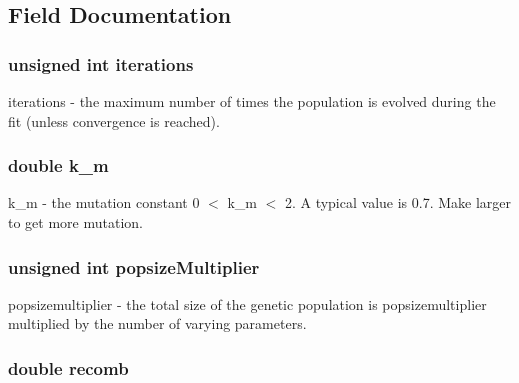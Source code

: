 \subsection{Field Documentation}
\hypertarget{structgencurvefit_options_a49884a390fe5592f17ab6795b728d63c}{
\subsubsection[{iterations}]{\setlength{\rightskip}{0pt plus 5cm}unsigned int {\bf iterations}}}
\label{structgencurvefit_options_a49884a390fe5592f17ab6795b728d63c}
iterations -\/ the maximum number of times the population is evolved during the fit (unless convergence is reached). \hypertarget{structgencurvefit_options_a59bef0ce7a5cd9e1caa5cfa556bde37f}{
\subsubsection[{k\_\-m}]{\setlength{\rightskip}{0pt plus 5cm}double {\bf k\_\-m}}}
\label{structgencurvefit_options_a59bef0ce7a5cd9e1caa5cfa556bde37f}
k\_\-m -\/ the mutation constant 0 $<$ k\_\-m $<$ 2. A typical value is 0.7. Make larger to get more mutation. \hypertarget{structgencurvefit_options_a7a71f8a56b1deaa38ea4f08c253a154f}{
\subsubsection[{popsizeMultiplier}]{\setlength{\rightskip}{0pt plus 5cm}unsigned int {\bf popsizeMultiplier}}}
\label{structgencurvefit_options_a7a71f8a56b1deaa38ea4f08c253a154f}
popsizemultiplier -\/ the total size of the genetic population is popsizemultiplier multiplied by the number of varying parameters. \hypertarget{structgencurvefit_options_ac0204c26d2cd7eb82bc13c199d03461e}{
\subsubsection[{recomb}]{\setlength{\rightskip}{0pt plus 5cm}double {\bf recomb}}}
